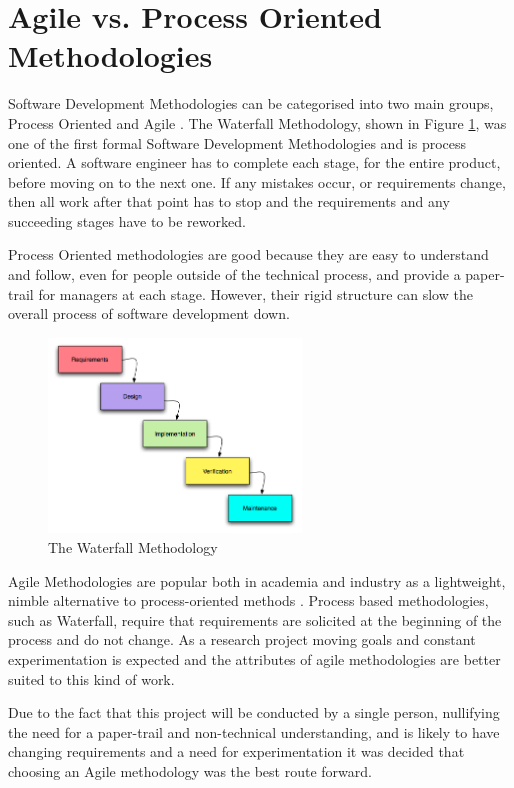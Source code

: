 \documentclass[11pt]{book}
\begin{document}
\section{Agile vs. Process Oriented Methodologies}
Software Development Methodologies can be categorised into two main groups, Process Oriented and Agile \cite{agilesoftwaredevelopementreview}. The Waterfall Methodology, shown in Figure \ref{fig:waterfall}, was one of the first formal Software Development Methodologies and is process oriented. A software engineer has to complete each stage, for the entire product, before moving on to the next one. If any mistakes occur, or requirements change, then all work after that point has to stop and the requirements and any succeeding stages have to be reworked.

Process Oriented methodologies are good because they are easy to understand and follow, even for people outside of the technical process, and provide a paper-trail for managers at each stage. However, their rigid structure can slow the overall process of software development down.

\begin{figure}[H]
	\centering
	\includegraphics[width=0.6\textwidth]{images/waterfall}
	\caption{The Waterfall Methodology \cite{traditionalwaterfall}}
	\label{fig:waterfall}
\end{figure}

Agile Methodologies are popular both in academia and industry as a lightweight, nimble alternative to process-oriented methods \cite{explainingagile}\cite{agilesoftwaredevelopementreview}. Process based methodologies, such as Waterfall, require that requirements are solicited at the beginning of the process and do not change. As a research project moving goals and constant experimentation is expected and the attributes of agile methodologies are better suited to this kind of work.

Due to the fact that this project will be conducted by a single person, nullifying the need for a paper-trail and non-technical understanding, and is likely to have changing requirements and a need for experimentation it was decided that choosing an Agile methodology was the best route forward.
\end{document}
